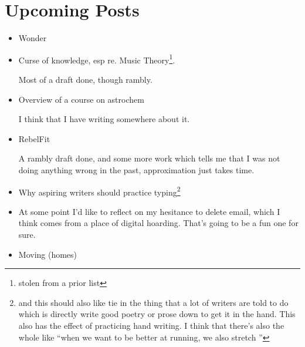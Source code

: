 \documentclass[12pt]{article}
\newcommand{\say}[1]{``#1''}
\renewcommand{\,}{\textsuperscript{,}}
\begin{document}
\section{Upcoming Posts}   
\begin{itemize}  
 \item Wonder   
 \item Curse of knowledge, esp re. Music Theory\footnote{stolen from a prior list}.

Most of a draft done, though rambly.   
 \item Overview of a course on astrochem

I think that I have writing somewhere about it.   
 \item RebelFit

A rambly draft done, and some more work which tells me that I was not doing anything wrong in the past, approximation just takes time.   
 \item Why aspiring writers should practice typing\footnote{and this should also like tie in the thing that a lot of writers are told to do which is directly write good poetry or prose down to get it in the hand. This also has the effect of practicing hand writing. I think that there's also the whole like \say{when we want to be better at running, we also stretch }}

\item At some point I'd like to reflect on my hesitance to delete email, which I think comes from a place of digital hoarding. That's going to be a fun one for sure.  
 \item Moving (homes)


\end{itemize}
\end{document}
